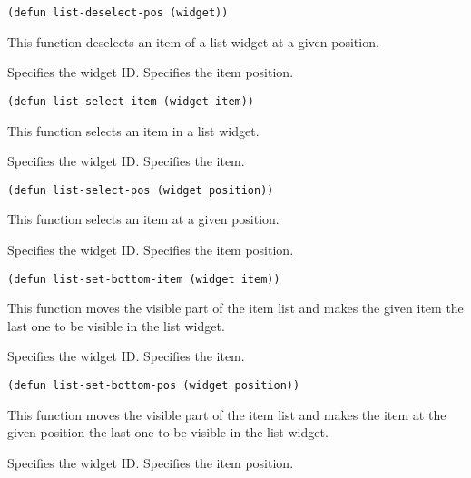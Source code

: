 \begin{lispd}
\syntax\begin{verbatim}
(defun list-deselect-pos (widget))
\end{verbatim}
\beschr This function deselects an item of a list widget at a given position.
\parameter
\begin{paramd}
 Specifies the widget ID.
 Specifies the item position.
\end{paramd}
\end{lispd}

\begin{lispd}
\syntax\begin{verbatim}
(defun list-select-item (widget item))
\end{verbatim}
\beschr This function selects an item in a list widget.
\parameter
\begin{paramd}
 Specifies the widget ID.
 Specifies the item.
\end{paramd}
\end{lispd}

\begin{lispd}
\syntax\begin{verbatim}
(defun list-select-pos (widget position))
\end{verbatim}
\beschr This function selects an item at a given position.
\parameter
\begin{paramd}
 Specifies the widget ID.
 Specifies the item position.
\end{paramd}
\end{lispd}

\begin{lispd}
\syntax\begin{verbatim}
(defun list-set-bottom-item (widget item))
\end{verbatim}
\beschr This function moves the visible part of the item list and makes 
the given item the last one to be visible in the list widget.
\parameter
\begin{paramd}
  Specifies the widget ID.
 Specifies the item.
\end{paramd}
\end{lispd}

\begin{lispd}
\syntax\begin{verbatim}
(defun list-set-bottom-pos (widget position))
\end{verbatim}
\beschr This function moves the visible part of the item list and makes the 
item at the given position the last one to be visible in the list widget.
\parameter
\begin{paramd}
  Specifies the widget ID.
 Specifies the item position.
\end{paramd}
\end{lispd}

